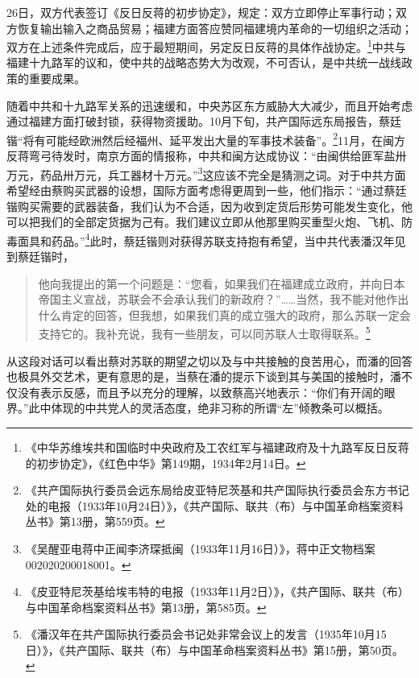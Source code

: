 26日，双方代表签订《反日反蒋的初步协定》，规定：双方立即停止军事行动；双方恢复输出输入之商品贸易；福建方面答应赞同福建境内革命的一切组织之活动；双方在上述条件完成后，应于最短期间，另定反日反蒋的具体作战协定。\footnote{《中华苏维埃共和国临时中央政府及工农红军与福建政府及十九路军反日反蒋的初步协定》，《红色中华》第149期，1934年2月14日。}中共与福建十九路军的议和，使中共的战略态势大为改观，不可否认，是中共统一战线政策的重要成果。


随着中共和十九路军关系的迅速缓和，中央苏区东方威胁大大减少，而且开始考虑通过福建方面打破封锁，获得物资援助。10月下旬，共产国际远东局报告，蔡廷锴“将有可能经欧洲然后经福州、延平发出大量的军事技术装备”。\footnote{《共产国际执行委员会远东局给皮亚特尼茨基和共产国际执行委员会东方书记处的电报（1933年10月24日）》，《共产国际、联共（布）与中国革命档案资料丛书》第13册，第559页。}11月，在闽方反蒋弯弓待发时，南京方面的情报称，中共和闽方达成协议：“由闽供给匪军盐卅万元，药品卅万元，兵工器材十万元。”\footnote{《吴醒亚电蒋中正闻李济琛抵闽（1933年11月16日）》，蒋中正文物档案002020200018001。}这应该不完全是猜测之词。对于中共方面希望经由蔡购买武器的设想，国际方面考虑得更周到一些，他们指示：“通过蔡廷锴购买需要的武器装备，我们认为不合适，因为收到定货后形势可能发生变化，他可以把我们的全部定货据为己有。我们建议立即从他那里购买重型火炮、飞机、防毒面具和药品。”\footnote{《皮亚特尼茨基给埃韦特的电报（1933年11月2日）》，《共产国际、联共（布）与中国革命档案资料丛书》第13册，第585页。}此时，蔡廷锴则对获得苏联支持抱有希望，当中共代表潘汉年见到蔡廷锴时，

\begin{quote}

他向我提出的第一个问题是：“您看，如果我们在福建成立政府，并向日本帝国主义宣战，苏联会不会承认我们的新政府？”……当然，我不能对他作出什么肯定的回答，但我想，如果我们真的成立强大的政府，那么苏联一定会支持它的。我补充说，我有一些朋友，可以同苏联人士取得联系。\footnote{《潘汉年在共产国际执行委员会书记处非常会议上的发言（1935年10月15日）》，《共产国际、联共（布）与中国革命档案资料丛书》第15册，第50页。}
\end{quote}


从这段对话可以看出蔡对苏联的期望之切以及与中共接触的良苦用心，而潘的回答也极具外交艺术，更有意思的是，当蔡在潘的提示下谈到其与美国的接触时，潘不仅没有表示反感，而且予以充分的理解，以致蔡高兴地表示：“你们有开阔的眼界。”此中体现的中共党人的灵活态度，绝非习称的所谓“左”倾教条可以概括。


